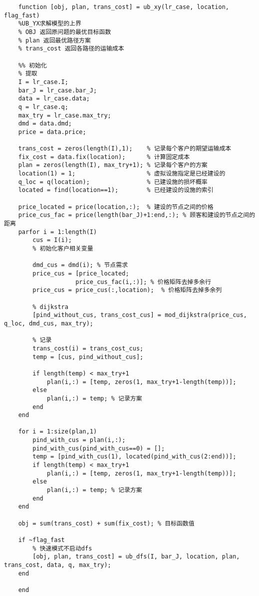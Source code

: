 {\begin{lstlisting}
    function [obj, plan, trans_cost] = ub_xy(lr_case, location, flag_fast)
    %UB_YX求解模型的上界
    % OBJ 返回原问题的最优目标函数
    % plan 返回最优路径方案
    % trans_cost 返回各路径的运输成本

    %% 初始化
    % 提取
    I = lr_case.I;
    bar_J = lr_case.bar_J;
    data = lr_case.data;
    q = lr_case.q;
    max_try = lr_case.max_try;
    dmd = data.dmd;
    price = data.price;

    trans_cost = zeros(length(I),1);    % 记录每个客户的期望运输成本
    fix_cost = data.fix(location);      % 计算固定成本
    plan = zeros(length(I), max_try+1); % 记录每个客户的方案
    location(1) = 1;                    % 虚拟设施指定是已经建设的
    q_loc = q(location);                % 已建设施的损坏概率
    located = find(location==1);        % 已经建设的设施的索引

    price_located = price(location,:);  % 建设的节点之间的价格
    price_cus_fac = price(length(bar_J)+1:end,:); % 顾客和建设的节点之间的距离
    parfor i = 1:length(I)
        cus = I(i);
        % 初始化客户相关变量
        
        dmd_cus = dmd(i); % 节点需求
        price_cus = [price_located; 
                    price_cus_fac(i,:)]; % 价格矩阵去掉多余行
        price_cus = price_cus(:,location);  % 价格矩阵去掉多余列

        % dijkstra
        [pind_without_cus, trans_cost_cus] = mod_dijkstra(price_cus, q_loc, dmd_cus, max_try);
        
        % 记录
        trans_cost(i) = trans_cost_cus;
        temp = [cus, pind_without_cus];

        if length(temp) < max_try+1
            plan(i,:) = [temp, zeros(1, max_try+1-length(temp))];
        else
            plan(i,:) = temp; % 记录方案
        end
    end

    for i = 1:size(plan,1)
        pind_with_cus = plan(i,:);
        pind_with_cus(pind_with_cus==0) = [];
        temp = [pind_with_cus(1), located(pind_with_cus(2:end))];
        if length(temp) < max_try+1
            plan(i,:) = [temp, zeros(1, max_try+1-length(temp))];
        else
            plan(i,:) = temp; % 记录方案
        end
    end

    obj = sum(trans_cost) + sum(fix_cost); % 目标函数值

    if ~flag_fast
        % 快速模式不启动dfs
        [obj, plan, trans_cost] = ub_dfs(I, bar_J, location, plan, trans_cost, data, q, max_try);
    end

    end



\end{lstlisting}}
